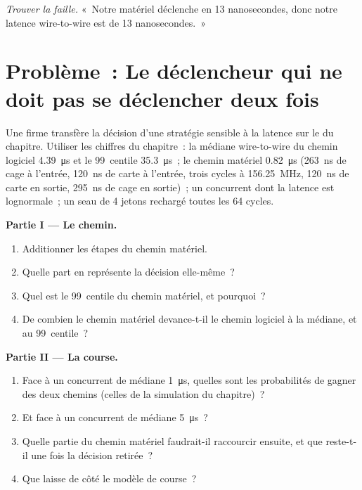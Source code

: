 \begin{exercise}[$\star\star\star$]\label{exo:nw:programmable-hardware-ii-trading-designs:8}
\emph{Trouver la faille.} «~Notre matériel déclenche en 13 nanosecondes, donc notre latence wire-to-wire est de 13 nanosecondes.~»
\end{exercise}

\section{Problème~: Le déclencheur qui ne doit pas se déclencher deux fois}

\begin{problem}\label{pb:nw:programmable-hardware-ii-trading-designs:1}
Une firme transfère la décision d'une stratégie sensible à la latence sur le  du chapitre. Utiliser les chiffres du chapitre~: la
médiane wire-to-wire du chemin logiciel \qty{4.39}{\micro\second} et le 99~centile \qty{35.3}{\micro\second}~; le chemin matériel \qty{0.82}{\micro\second}
(\qty{263}{\nano\second} de cage à l'entrée, \qty{120}{\nano\second} de carte à l'entrée, trois cycles à 156.25~MHz, \qty{120}{\nano\second} de carte en sortie,
\qty{295}{\nano\second} de cage en sortie)~; un concurrent dont la latence est lognormale~; un seau de 4 jetons rechargé toutes les 64 cycles.

\medskip\noindent\textbf{Partie I --- Le chemin.}
\begin{enumerate}
\item Additionner les étapes du chemin matériel.
\item Quelle part en représente la décision elle-même~?
\item Quel est le 99~centile du chemin matériel, et pourquoi~?
\item De combien le chemin matériel devance-t-il le chemin logiciel à la médiane, et au 99~centile~?
\end{enumerate}

\medskip\noindent\textbf{Partie II --- La course.}
\begin{enumerate}[resume]
\item Face à un concurrent de médiane \qty{1}{\micro\second}, quelles sont les probabilités de gagner des deux chemins (celles de la
  simulation du chapitre)~?
\item Et face à un concurrent de médiane \qty{5}{\micro\second}~?
\item Quelle partie du chemin matériel faudrait-il raccourcir ensuite, et que reste-t-il une fois la décision retirée~?
\item Que laisse de côté le modèle de course~?
\end{enumerate}


\end{problem}
